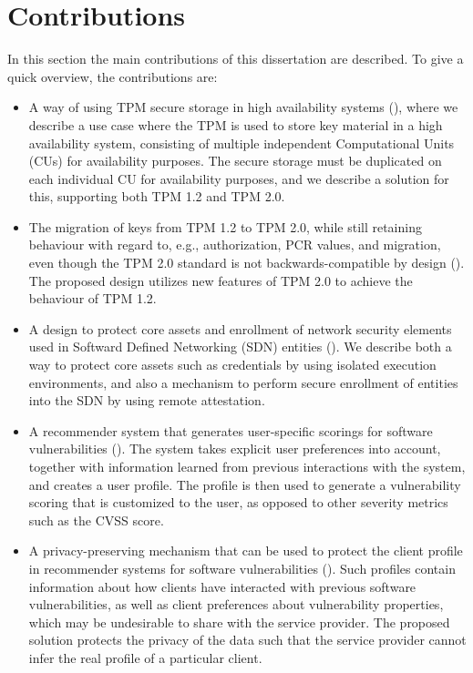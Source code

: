 \section{Contributions}
\label{sec:kappa-contributions}

In this section the main contributions of this dissertation are described.
To give a quick overview, the contributions are:

\begin{itemize}
  \item A way of using TPM secure storage in high availability systems (), where we describe a use case where the TPM is used to store key material in a high availability system, consisting of multiple independent Computational Units (CUs) for availability purposes.
  The secure storage must be duplicated on each individual CU for availability purposes, and we describe a solution for this, supporting both TPM 1.2 and TPM 2.0.

  \item The migration of keys from TPM 1.2 to TPM 2.0, while still retaining behaviour with regard to, e.g., authorization, PCR values, and migration, even though the TPM 2.0 standard is not backwards-compatible by design ().
  The proposed design utilizes new features of TPM 2.0 to achieve the behaviour of TPM 1.2.

  \item A design to protect core assets and enrollment of network security elements used in Softward Defined Networking (SDN) entities ().
  We describe both a way to protect core assets such as credentials by using isolated execution environments, and also a mechanism to perform secure enrollment of entities into the SDN by using remote attestation.

  \item A recommender system that generates user-specific scorings for software vulnerabilities ().
  The system takes explicit user preferences into account, together with information learned from previous interactions with the system, and creates a user profile.
  The profile is then used to generate a vulnerability scoring that is customized to the user, as opposed to other severity metrics such as the CVSS score.

  \item A privacy-preserving mechanism that can be used to protect the client profile in recommender systems for software vulnerabilities ().
  Such profiles contain information about how clients have interacted with previous software vulnerabilities, as well as client preferences about vulnerability properties, which may be undesirable to share with the service provider.
  The proposed solution protects the privacy of the data such that the service provider cannot infer the real profile of a particular client.


\end{itemize}

